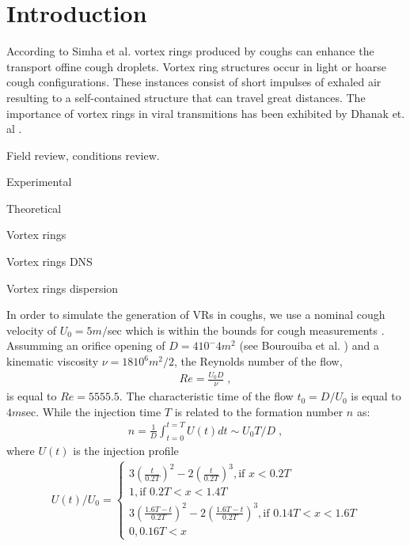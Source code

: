 \documentclass[%
 aip,
 amsmath,amssymb,
 reprint,%
]{revtex4-1}
\begin{document}
\maketitle

\section{\label{sec:Intro}Introduction}

According to Simha et al. \cite{PrasannaSimha2020} vortex rings produced by coughs can enhance the transport offine cough droplets.  Vortex ring structures occur in light or hoarse cough configurations. These instances consist of short impulses of exhaled air resulting to a self-contained structure that can travel great distances. The importance of vortex rings in viral transmitions has been exhibited by Dhanak et. al \cite{Verma2020}. 


Field review, conditions review.



Experimental

Theoretical

Vortex rings

Vortex rings DNS

Vortex rings dispersion

In order to simulate the generation of VRs in coughs, we use a nominal cough velocity of $U_0=5m/$sec which is within the bounds for cough measurements \cite{Tang2009,PrasannaSimha2020}.
Assumming an orifice opening of $D=4 10^-4m^2$ (see Bourouiba et al. \cite{Bourouiba2014}) and a kinematic viscosity $\nu=18 10^6m^2/2$, the Reynolds number of the flow,
\begin{eqnarray}
	Re=\frac{U_0 D}{\nu} \;,
\end{eqnarray}
is equal to $Re=5555.5$. The characteristic time of the flow $t_0=D/U_0$ is equal to $4m$sec. While the injection time $T$ is related to the formation number $n$ as:
\begin{eqnarray}
	n=\frac{1}{D} \int_{t=0}^{t=T} U(t)dt \sim U_0 T/D\;,
\end{eqnarray}
where $U(t)$  is the injection profile
\begin{eqnarray}
U(t)/U_0= 
\begin{cases}
	3\left(\frac{t}{0.2T}\right)^2-2\left(\frac{t}{0.2T}\right)^3, \text{if } x < 0.2T \\
	1 , \text{if } 0.2T < x < 1.4T\\
	3\left(\frac{1.6T-t}{0.2T}\right)^2-2\left(\frac{1.6T-t}{0.2T}\right)^3, \text{if } 0.14T < x < 1.6T\\
	0, 0.16T < x 
\end{cases}
\end{eqnarray}
\end{document}
